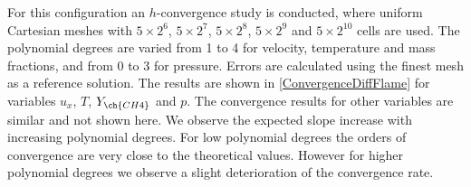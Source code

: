 For this configuration an $h$-convergence study is conducted, where uniform Cartesian meshes with  $5\times2^6$, $5\times2^7$, $5\times2^8$,  $5\times2^9$ and $5\times2^{10}$  cells are used. The polynomial degrees are varied from 1 to 4 for velocity, temperature and mass fractions, and from 0 to 3 for pressure.  Errors are calculated using the finest mesh as a reference solution.  The results are shown in \cref{ConvergenceDiffFlame} for variables $u_x$, $T$, $Y_{\ch{CH4}}$ and $p$. The convergence results for other variables are similar and not shown here. We observe the expected slope increase with increasing polynomial degrees. For low polynomial degrees the orders of convergence are very close to the theoretical values. However for higher polynomial degrees we observe a slight deterioration of the convergence rate.  

